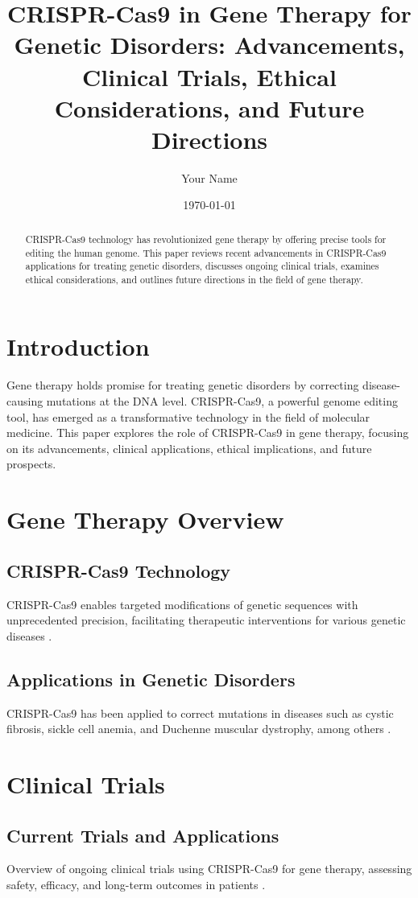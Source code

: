 \documentclass[12pt]{article}
\title{CRISPR-Cas9 in Gene Therapy for Genetic Disorders: Advancements, Clinical Trials, Ethical Considerations, and Future Directions}
\author{Your Name}
\date{\today}
\begin{document}
\maketitle

\begin{abstract}
CRISPR-Cas9 technology has revolutionized gene therapy by offering precise tools for editing the human genome. This paper reviews recent advancements in CRISPR-Cas9 applications for treating genetic disorders, discusses ongoing clinical trials, examines ethical considerations, and outlines future directions in the field of gene therapy.
\end{abstract}

\section{Introduction}
Gene therapy holds promise for treating genetic disorders by correcting disease-causing mutations at the DNA level. CRISPR-Cas9, a powerful genome editing tool, has emerged as a transformative technology in the field of molecular medicine. This paper explores the role of CRISPR-Cas9 in gene therapy, focusing on its advancements, clinical applications, ethical implications, and future prospects.

\section{Gene Therapy Overview}
\subsection{CRISPR-Cas9 Technology}
CRISPR-Cas9 enables targeted modifications of genetic sequences with unprecedented precision, facilitating therapeutic interventions for various genetic diseases \citep{jinek2012programmable, doudna2014new}.

\subsection{Applications in Genetic Disorders}
CRISPR-Cas9 has been applied to correct mutations in diseases such as cystic fibrosis, sickle cell anemia, and Duchenne muscular dystrophy, among others \citep{long2016correction, xu2019precise}.

\section{Clinical Trials}
\subsection{Current Trials and Applications}
Overview of ongoing clinical trials using CRISPR-Cas9 for gene therapy, assessing safety, efficacy, and long-term outcomes in patients \citep{maeder2013robust, liang2015targeted}.
\end{document}
